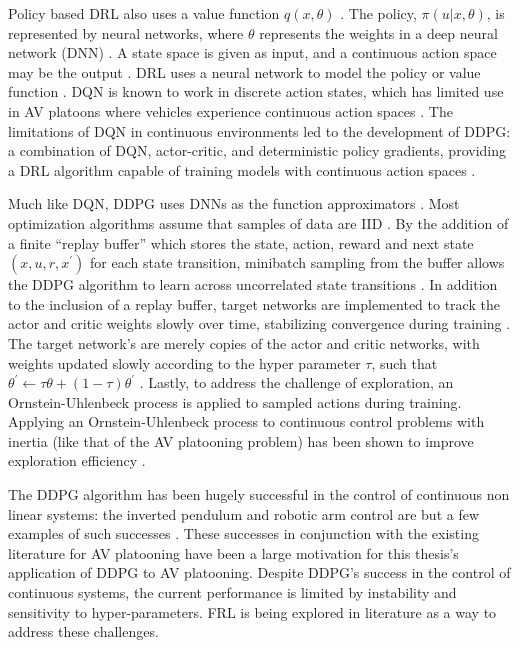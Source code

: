 Policy based DRL also uses a value function $q(x, \theta)$
\cite{sutton2018reinforcement, sWang2017}. The policy, $\pi(u|x, \theta)$, is represented
by neural networks, where $\theta$ represents the weights in a deep neural network (DNN)
\cite{Zhu2018}.  A state space is given as input, and a continuous action space may be
the output \cite{Zhu2018}. DRL uses a neural network to model the policy or value
function \cite{Zhu2018}.  DQN is known to work in discrete action states, which has
limited use in AV platoons where vehicles experience continuous action spaces
\cite{Zhu2018, sWang2017}. The limitations of DQN in continuous environments led to
the development of DDPG: a combination of DQN, actor-critic, and deterministic
policy gradients, providing a DRL algorithm capable of training models with continuous
action spaces \cite{Lillicrap2016, sWang2017}.

Much like DQN, DDPG uses DNNs as the function approximators \cite{Zhu2018}.  Most
optimization algorithms assume that samples of data are IID \cite{Lillicrap2016}.
By the addition of a finite ``replay buffer'' which stores the state, action, reward
and next state $(x, u, r, x^{'})$ for each state transition, minibatch sampling from
the buffer allows the DDPG algorithm to learn across uncorrelated state transitions
\cite{Lillicrap2016}.  In addition to the inclusion of a replay buffer, target
networks are implemented to track the actor and critic weights slowly over time, stabilizing
convergence during training \cite{Lillicrap2016, Zhu2018}.  The target network's are
merely copies of the actor and critic networks, with weights updated slowly according to
the hyper parameter $\tau$, such that
$ \theta^{'} \leftarrow \tau\theta + (1-\tau)\theta^{'} $ \cite{Lillicrap2016}.
Lastly, to address the challenge of exploration, an Ornstein-Uhlenbeck process is
applied to sampled actions during training. Applying an Ornstein-Uhlenbeck process
to continuous control problems with inertia (like that of the AV platooning problem)
has been shown to improve exploration efficiency \cite{Lillicrap2016}.

The DDPG algorithm has been hugely successful in the control of continuous non
linear systems: the inverted pendulum and robotic arm control are but a few examples
of such successes \cite{Lim2020}. These successes in conjunction with the existing
literature for AV platooning have been a large motivation for this thesis's application of
DDPG to AV platooning. Despite DDPG's success in the control of continuous systems, the
current performance is limited by instability and sensitivity to hyper-parameters.
FRL is being explored in literature as a way to address these challenges.

